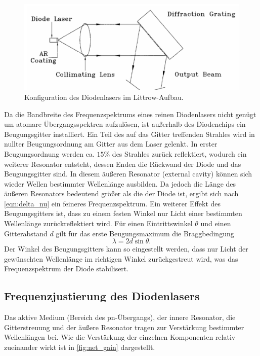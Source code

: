 \begin{figure}
    \centering
    \includegraphics[scale=0.4]{content/pics/aufbau_laser.png}
    \caption{Konfiguration des Diodenlasers im Littrow-Aufbau. \cite{diode_laser_spectroscopy}}
    \label{fig:aufbau}
\end{figure}

Da die Bandbreite des Frequenzspektrums eines reinen Diodenlasers nicht genügt um atomare Übergangsspektren aufzulösen, ist außerhalb des Diodenchips ein Beugungsgitter installiert. 
Ein Teil des auf das Gitter treffenden Strahles wird in nullter Beugungsordnung am Gitter aus dem Laser gelenkt. In erster Beugungsordnung werden ca. $15 \%$ 
des Strahles zurück reflektiert, wodurch ein weiterer Resonator entsteht, dessen Enden die Rückwand der Diode und das Beugungsgitter sind. In diesem äußeren Resonator 
(external cavity) können sich wieder Wellen bestimmter Wellenlänge ausbilden. Da jedoch die Länge des äußeren Resonators bedeutend größer als die der Diode ist, ergibt 
sich nach \autoref{eqn:delta_nu} ein feineres Frequenzspektrum. Ein weiterer Effekt des Beugungsgitters ist, dass zu einem festen Winkel nur Licht einer bestimmten
Wellenlänge zurückreflektiert wird. Für einen Eintrittswinkel $\theta$ und einen Gitterabstand $d$ gilt für das erste Beugungsmaximum die Braggbedingung 
\begin{equation}
    \label{eqn:Bragg}
    \lambda = 2d \sin\theta.
\end{equation}
Der Winkel des Beugungsgitters kann so eingestellt werden, dass nur Licht der gewünschten Wellenlänge im richtigen Winkel zurückgestreut wird, was das Frequenzspektrum der 
Diode stabilisert. 

\subsection{Frequenzjustierung des Diodenlasers}
Das aktive Medium (Bereich des pn-Übergangs), der innere Resonator, die Gitterstreuung und der äußere Resonator tragen zur Verstärkung bestimmter Wellenlängen 
bei. Wie die Verstärkung der einzelnen Komponenten relativ zueinander wirkt ist in \autoref{fig:net_gain} dargestellt.

